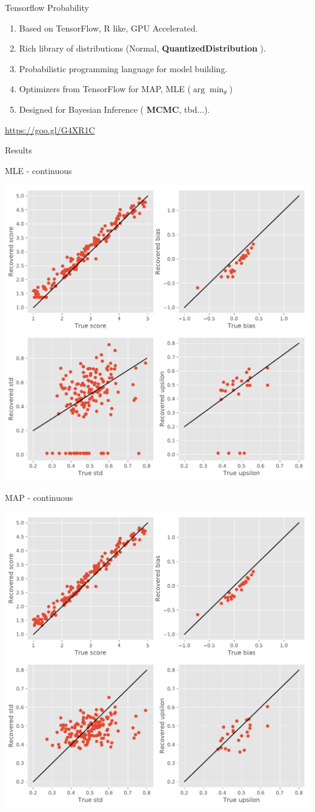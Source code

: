 \documentclass{beamer}
\begin{document}
\begin{frame}{Tensorflow Probability}
	\begin{enumerate}
		\item Based on TensorFlow, R like, GPU Accelerated.
		\item Rich library of distributions (Normal, {\bf QuantizedDistribution} ).
		\item Probabilistic programming language for model building.
		\item Optimizers from TensorFlow for MAP, MLE ($\arg\min_\theta$) 
		\item Designed for Bayesian Inference ( {\bf MCMC}, tbd...).
	\end{enumerate}
\begin{example}
	\url{https://goo.gl/G4XR1C}
\end{example}
\end{frame}
\begin{frame}{}
\begin{center}
	\large
	Results
\end{center}
\end{frame}
\begin{frame}{MLE - continuous}
\begin{center}
	\includegraphics[width=0.6\linewidth]{mlenorm}
\end{center}
\end{frame}

\begin{frame}{MAP - continuous}
\begin{center}
	\includegraphics[width=0.6\linewidth]{mapnorm}
\end{center}
\end{frame}
\end{document}
